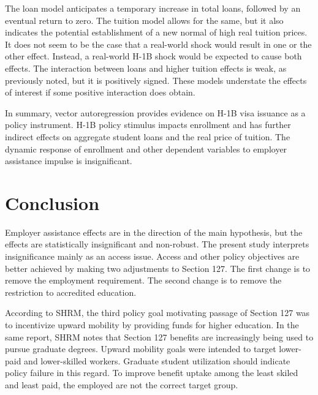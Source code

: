 \documentclass[review]{elsarticle}
\begin{document}
The loan model anticipates a temporary increase in total loans, followed by an eventual return to zero.
The tuition model allows for the same, but it also indicates the potential establishment of a new normal
of high real tuition prices.
It does not seem to be the case that a real-world shock would result in one or the other effect.
Instead, a real-world H-1B shock would be expected to cause both effects.
The interaction between loans and higher tuition effects is weak, as previously noted, but it is positively signed.
These models understate the effects of interest if some positive interaction does obtain.

In summary, vector autoregression provides evidence on H-1B visa issuance as a policy instrument.
H-1B policy stimulus impacts enrollment and has further indirect effects on aggregate student loans and the real price of tuition.
The dynamic response of enrollment and other dependent variables to employer assistance impulse is insignificant.

\section{Conclusion}

Employer assistance effects are in the direction of the main hypothesis,
but the effects are statistically insignificant and non-robust.
The present study interprets insignificance mainly as an access issue.
Access and other policy objectives are better achieved by making two adjustments to Section 127.
The first change is to remove the employment requirement.
The second change is to remove the restriction to accredited education.

According to SHRM\cite{jones_2010}, the third policy goal motivating passage of Section 127 was to incentivize upward mobility by providing funds for higher education.
In the same report, SHRM notes that Section 127 benefits are increasingly being used to pursue graduate degrees.
Upward mobility goals were intended to target lower-paid and lower-skilled workers.
Graduate student utilization should indicate policy failure in this regard.
To improve benefit uptake among the least skiled and least paid, the employed are not the correct target group.
\end{document}

